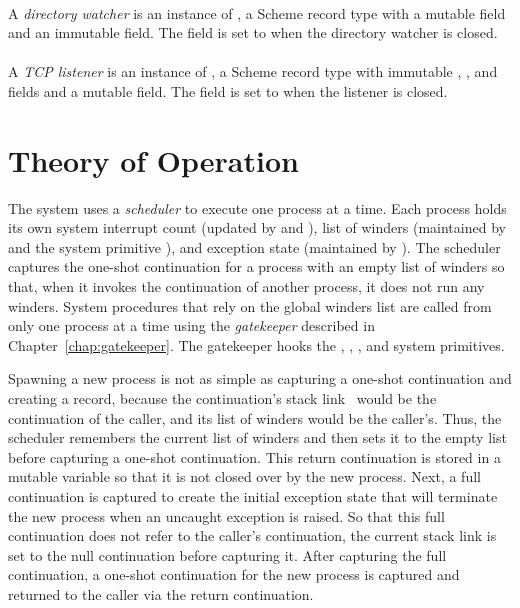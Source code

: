 \paragraph {}
A \emph{directory watcher} is an instance of
, a Scheme record type with a mutable
 field and an immutable  field. The
 field is set to  when the directory
watcher is closed.

\paragraph {}
A \emph{TCP listener} is an instance of
, a Scheme record type with immutable ,
, and  fields and a mutable
 field. The  field is set to  when
the listener is closed.

\section {Theory of Operation}\label{sec:erlang-theory}

The system uses a \emph{scheduler} to execute one
process at a time. Each process holds its own system interrupt count
(updated by  and ),
list of winders (maintained by  and the system
primitive ), and exception state (maintained
by ). The scheduler captures the
one-shot continuation for a process with an empty list of winders so
that, when it invokes the continuation of another process, it does not
run any winders.  \mitigation
System procedures that rely on the global winders list are called from
only one process at a time using the
\emph{gatekeeper} described in
Chapter~\ref{chap:gatekeeper}. The gatekeeper hooks the ,
, , and  system
primitives.

Spawning a new process is not as simple as capturing a one-shot
continuation and creating a  record, because the
continuation's stack link~\cite{representing-control} would be the
continuation of the caller, and its list of winders would be the
caller's. Thus, the scheduler remembers the current list of winders
and then sets it to the empty list before capturing a one-shot
continuation.  This return continuation is stored in a mutable
variable so that it is not closed over by the new process.  Next, a
full continuation is captured to create the initial exception state
that will terminate the new process when an uncaught exception is
raised. So that this full continuation does not refer to the caller's
continuation, the current stack link is set to the null continuation
before capturing it. After capturing the full continuation, a one-shot
continuation for the new process is captured and returned to the
caller via the return continuation.

